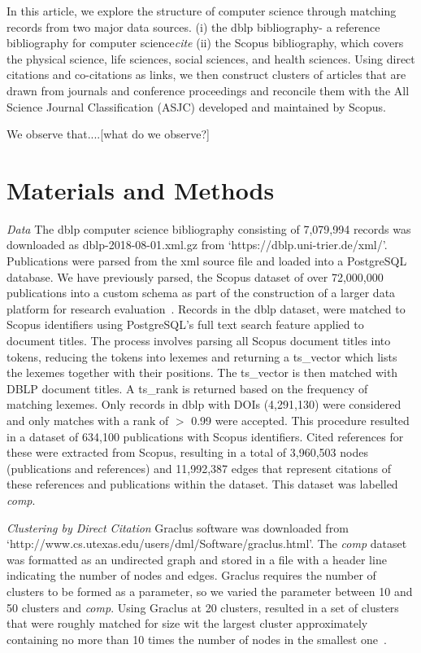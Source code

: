 In this article, we explore the structure of computer science through matching records from two major data sources. (i) the dblp bibliography- a reference bibliography for computer science\emph{cite} (ii) the Scopus bibliography, which covers the physical science, life sciences, social sciences, and health sciences. Using direct citations and co-citations as links, we then construct clusters of articles that are drawn from journals and conference proceedings  and reconcile them with the All Science Journal Classification (ASJC) developed and maintained by Scopus. 

We observe that....[what do we observe?]

\section{Materials and Methods}


\emph{Data} The dblp computer science bibliography consisting of 7,079,994 records was downloaded as dblp-2018-08-01.xml.gz from  `https://dblp.uni-trier.de/xml/'. Publications were parsed from the xml source file and loaded into a PostgreSQL database. We have previously parsed, the Scopus dataset of over 72,000,000 publications into a custom schema as part of the construction of a larger data platform for research evaluation~\cite{Korobskiy_2019}. Records in the dblp dataset, were matched to Scopus identifiers using PostgreSQL's full text search feature applied to document titles. The process involves parsing all Scopus document titles into tokens, reducing the tokens into lexemes and returning a ts\_vector which lists the lexemes together with their positions. The ts\_vector is then matched with DBLP document titles. A ts\_rank is returned based on the frequency of matching lexemes. Only records in dblp with DOIs (4,291,130) were considered and only matches with a rank of $>$ 0.99 were accepted. This procedure resulted in a dataset of 634,100 publications with Scopus identifiers. Cited references for these were extracted from Scopus, resulting in a total of 3,960,503 nodes (publications and references) and 11,992,387 edges that represent citations of these references and publications within the dataset. This dataset was labelled \emph{comp}.\par

\emph{Clustering by Direct Citation} Graclus software was downloaded from \\`http://www.cs.utexas.edu/users/dml/Software/graclus.html'. The \emph{comp} dataset was formatted as an undirected graph and stored in a file with a header line indicating the number of nodes and edges. Graclus requires the number of clusters to be formed as a parameter, so we varied the parameter between 10 and 50 clusters and \emph{comp}. Using Graclus at 20 clusters, resulted in a set of clusters that were roughly matched for size wit the largest cluster approximately containing no more than 10 times the number of nodes in the smallest one~\cite{traag_louvain_2019}.

